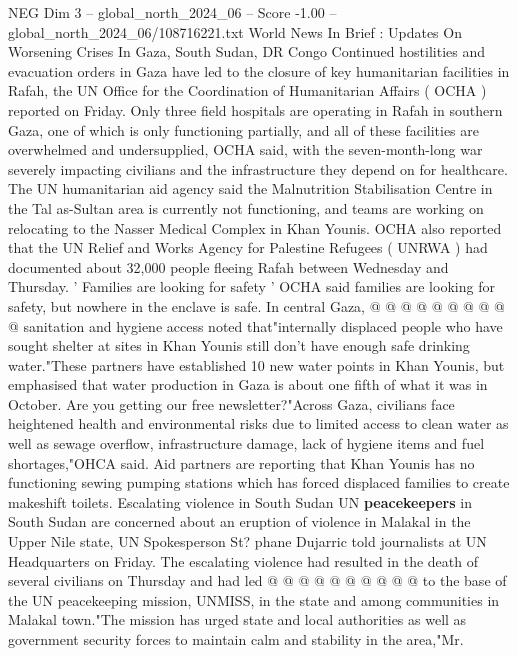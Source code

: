 \begin{textsample}{NEG Dim 3 – global\_north\_2024\_06 – Score -1.00 – global\_north\_2024\_06/108716221.txt}  \label{ex:f3_neg_380}
World News In Brief : Updates On Worsening Crises In Gaza, South Sudan, DR Congo Continued hostilities and evacuation orders in Gaza have led to the closure of key humanitarian facilities in Rafah, the UN Office for the Coordination of Humanitarian Affairs ( OCHA ) reported on Friday.
Only three field hospitals are operating in Rafah in southern Gaza, one of which is only functioning partially, and all of these facilities are overwhelmed and undersupplied, OCHA said, with the seven-month-long war severely impacting civilians and the infrastructure they depend on for healthcare.
The UN humanitarian aid agency said the Malnutrition Stabilisation Centre in the Tal as-Sultan area is currently not functioning, and teams are working on relocating to the Nasser Medical Complex in Khan Younis.
OCHA also reported that the UN Relief and Works Agency for Palestine Refugees ( UNRWA ) had documented about 32,000 people fleeing Rafah between Wednesday and Thursday. ' Families are looking for safety ' OCHA said families are looking for safety, but nowhere in the enclave is safe.
In central Gaza, @ @ @ @ @ @ @ @ @ @ sanitation and hygiene access noted that"internally displaced people who have sought shelter at sites in Khan Younis still don't have enough safe drinking water."These partners have established 10 new water points in Khan Younis, but emphasised that water production in Gaza is about one fifth of what it was in October.
Are you getting our free newsletter?"Across Gaza, civilians face heightened health and environmental risks due to limited access to clean water as well as sewage overflow, infrastructure damage, lack of hygiene items and fuel shortages,"OHCA said.
Aid partners are reporting that Khan Younis has no functioning sewing pumping stations which has forced displaced families to create makeshift toilets.
Escalating violence in South Sudan UN \textbf{peacekeepers} in South Sudan are concerned about an eruption of violence in Malakal in the Upper Nile state, UN Spokesperson St? phane Dujarric told journalists at UN Headquarters on Friday.
The escalating violence had resulted in the death of several civilians on Thursday and had led @ @ @ @ @ @ @ @ @ @ to the base of the UN peacekeeping mission, UNMISS, in the state and among communities in Malakal town."The mission has urged state and local authorities as well as government security forces to maintain calm and stability in the area,"Mr.

\end{textsample}
